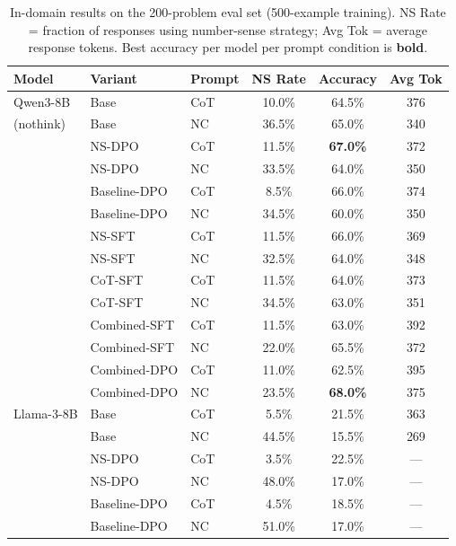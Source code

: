 \begin{table}[t]
\centering
\caption{In-domain results on the 200-problem eval set (500-example training). NS Rate = fraction of responses using number-sense strategy; Avg Tok = average response tokens. Best accuracy per model per prompt condition is \textbf{bold}.}
\label{tab:training}
\small
\begin{tabular}{ll l ccc}
\toprule
Model & Variant & Prompt & NS Rate & Accuracy & Avg Tok \\
\midrule
Qwen3-8B   & Base          & CoT & 10.0\% & 64.5\%          & 376 \\
(nothink)  & Base          & NC  & 36.5\% & 65.0\%          & 340 \\
           & NS-DPO        & CoT & 11.5\% & \textbf{67.0\%} & 372 \\
           & NS-DPO        & NC  & 33.5\% & 64.0\%          & 350 \\
           & Baseline-DPO  & CoT &  8.5\% & 66.0\%          & 374 \\
           & Baseline-DPO  & NC  & 34.5\% & 60.0\%          & 350 \\
           & NS-SFT        & CoT & 11.5\% & 66.0\%          & 369 \\
           & NS-SFT        & NC  & 32.5\% & 64.0\%          & 348 \\
           & CoT-SFT       & CoT & 11.5\% & 64.0\%          & 373 \\
           & CoT-SFT       & NC  & 34.5\% & 63.0\%          & 351 \\
           & Combined-SFT  & CoT & 11.5\% & 63.0\%          & 392 \\
           & Combined-SFT  & NC  & 22.0\% & 65.5\%          & 372 \\
           & Combined-DPO  & CoT & 11.0\% & 62.5\%          & 395 \\
           & Combined-DPO  & NC  & 23.5\% & \textbf{68.0\%} & 375 \\
\midrule
Llama-3-8B & Base          & CoT &  5.5\% & 21.5\%          & 363 \\
           & Base          & NC  & 44.5\% & 15.5\%          & 269 \\
           & NS-DPO        & CoT &  3.5\% & 22.5\%          & --- \\
           & NS-DPO        & NC  & 48.0\% & 17.0\%          & --- \\
           & Baseline-DPO  & CoT &  4.5\% & 18.5\%          & --- \\
           & Baseline-DPO  & NC  & 51.0\% & 17.0\%          & --- \\

\end{tabular}
\end{table}
